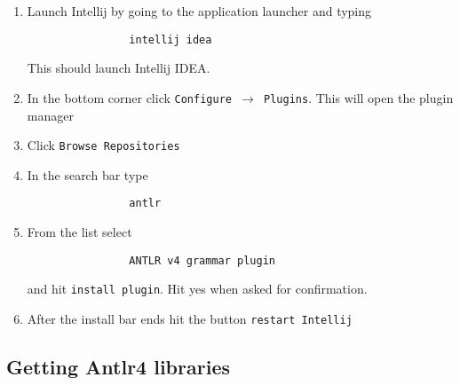 \documentclass{article}
\begin{document}
		\begin{enumerate}
			\item Launch Intellij by going to the application launcher and typing
			\begin{lstlisting}
				intellij idea
			\end{lstlisting}
			This should launch Intellij IDEA.

			\item In the bottom corner click \texttt{Configure $\rightarrow$ Plugins}. This will open the plugin manager

			\item Click \texttt{Browse Repositories}

			\item In the search bar type
			\begin{lstlisting}
				antlr
			\end{lstlisting}

			\item From the list select
			\begin{lstlisting}
				ANTLR v4 grammar plugin
			\end{lstlisting}
			and hit \texttt{install plugin}. Hit yes when asked for confirmation.

			\item After the install bar ends hit the button \texttt{restart Intellij}
		\end{enumerate}


	\subsection{Getting Antlr4 libraries}
\end{document}
